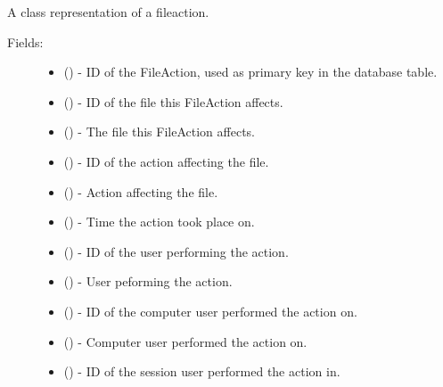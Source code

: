 \documentclass[letterpaper,10pt,english]{sphinxmanual}
\begin{document}
\begin{fulllineitems}
\label{models:models.FileAction}
A class representation of a fileaction.
\begin{description}
\item[{Fields:}] \leavevmode\begin{itemize}
\item {} 
        ()        - ID of the FileAction, used as primary key in the database table.

\item {} 
        ()        - ID of the file this FileAction affects.

\item {} 
 ()        - The file this FileAction affects.

\item {} 
        ()        - ID of the action affecting the file.

\item {} 
 ()        - Action affecting the file.

\item {} 
        ()        - Time the action took place on.

\item {} 
        ()        - ID of the user performing the action.

\item {} 
 ()        - User peforming the action.

\item {} 
        ()        - ID of the computer user performed the action on.

\item {} 
 ()        - Computer user performed the action on.

\item {} 
        ()        - ID of the session user performed the action in.


\end{itemize}
\end{description}
\end{fulllineitems}
\end{document}

